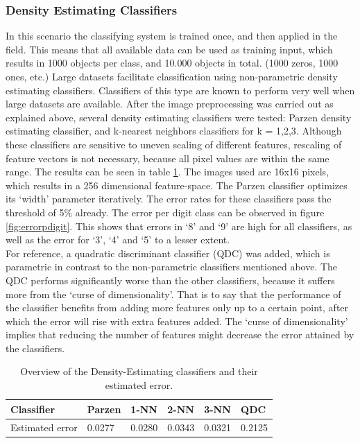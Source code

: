 \subsubsection*{Density Estimating Classifiers}
In this scenario the classifying system is trained once, and then applied in the field. This means that all available data can be used as training input, which results in 1000 objects per class, and 10.000 objects in total. (1000 zeros, 1000 ones, etc.) Large datasets facilitate classification using non-parametric density estimating classifiers. Classifiers of this type are known to perform very well when large datasets are available. After the image preprocessing was carried out as explained above, several density estimating classifiers were tested: Parzen density estimating classifier, and k-nearest neighbors classifiers for k = 1,2,3. Although these classifiers are sensitive to uneven scaling of different features, rescaling of feature vectors is not necessary, because all pixel values are within the same range. The results can be seen in table \ref{tab:density}. The images used are 16x16 pixels, which results in a 256 dimensional feature-space. The Parzen classifier optimizes its ‘width’ parameter iteratively. The error rates for these classifiers pass the threshold of 5\% already. The error per digit class can be observed in figure \ref{fig:errorpdigit}. This shows that errors in ‘8’ and ‘9’ are high for all classifiers, as well as the error for ‘3’, ‘4’ and ‘5’ to a lesser extent. \\
For reference, a quadratic discriminant classifier (QDC) was added, which is parametric in contrast to the non-parametric classifiers mentioned above. The QDC performs significantly worse than the other classifiers, because it suffers more from the ‘curse of dimensionality’. That is to say that the performance of the classifier benefits from adding more features only up to a certain point, after which the error will rise with extra features added. The ‘curse of dimensionality’ implies that reducing the number of features might decrease the error attained by the classifiers.
\begin{table}[H]
	\centering
	\caption{Overview of the Density-Estimating classifiers and their estimated error.}
	\label{tab:density}
	\begin{tabular}{l|lllll}
		Classifier      & Parzen & 1-NN   & 2-NN   & 3-NN   & QDC    \\ \hline
		Estimated error & 0.0277 & 0.0280 & 0.0343 & 0.0321 & 0.2125
	\end{tabular}
\end{table}
